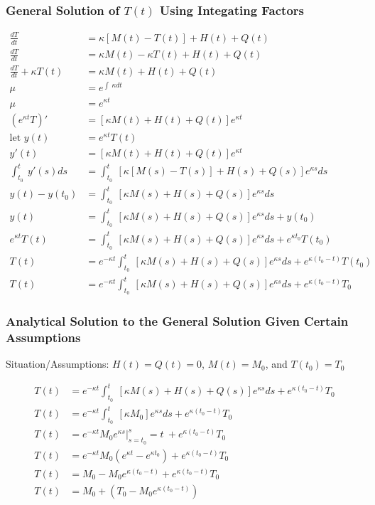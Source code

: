 \documentclass[titlepage]{article}
\begin{document}
\subsubsection{General Solution of $T(t)$ Using Integating Factors}\label{calc:integrating factors}
\begin{align*}
    \frac{dT}{dt} &= \kappa[M(t)-T(t)]+H(t)+Q(t) \\
    \frac{dT}{dt} &= \kappa M(t)- \kappa T(t) +H(t)+Q(t) \\
    \frac{dT}{dt} + \kappa T(t) &= \kappa M(t) +H(t)+Q(t) \\
    \mu &= e^{\int \:\kappa dt} \tag{integrating factor}\\
    \mu &= e^{\kappa t} \\
    (e^{\kappa t} T)' &= [\kappa M(t)+H(t)+Q(t)]e^{\kappa t} \\
    \text{let } y(t) &=e^{\kappa t} T(t) \tag{substitution}\\
    y'(t) &= [\kappa M(t)+H(t)+Q(t)]e^{\kappa t} \\
    \int _{t_0}^t\:y'\left(s\right)ds &= \int _{t_0}^t\:[\kappa[M(s)-T(s)]+H(s)+Q(s)]e^{\kappa s}ds\\
    y(t)-y(t_0) &= \int _{t_0}^t\:[\kappa M(s)+H(s)+Q(s)]e^{\kappa s}ds\\
    y(t) &= \int _{t_0}^t\:[\kappa M(s)+H(s)+Q(s)]e^{\kappa s}ds +y(t_0)\\
    e^{\kappa t} T(t) &= \int _{t_0}^t\:[\kappa M(s)+H(s)+Q(s)]e^{\kappa s}ds +e^{\kappa t_0} T(t_0)\\
    T(t) &= e^{-\kappa t}\int _{t_0}^t\:[\kappa M(s)+H(s)+Q(s)]e^{\kappa s}ds +e^{\kappa (t_0-t)} T(t_0)\\
    T(t) &= e^{-\kappa t}\int _{t_0}^t\:[\kappa M(s)+H(s)+Q(s)]e^{\kappa s}ds +e^{\kappa (t_0-t)} T_0        
\end{align*}

\subsubsection{Analytical Solution to the General Solution Given Certain Assumptions}\label{calc:analytical}
\begin{center}
    Situation/Assumptions: $H(t)=Q(t)=0$, $M(t)=M_0$, and $T(t_0)=T_0$
\end{center}
\begin{align*}
    T(t) &= e^{-\kappa t}\int _{t_0}^t\:[\kappa M(s)+H(s)+Q(s)]e^{\kappa s}ds +e^{\kappa (t_0-t)} T_0 \tag{general solution}\\
    T(t) &= e^{-\kappa t}\int _{t_0}^t\:[\kappa M_0]e^{\kappa s}ds +e^{\kappa (t_0-t)} T_0 \tag{plug in assumptions}\\
    T(t) &= e^{-\kappa t} M_0 e^{\kappa s}|_{s=t_0}^s=t\: +e^{\kappa (t_0-t)} T_0\\
    T(t) &= e^{-\kappa t} M_0 (e^{\kappa t}-e^{\kappa t_0})  +e^{\kappa (t_0-t)} T_0\\
    T(t) &= M_0 - M_0 e^{\kappa (t_0-t)}  +e^{\kappa (t_0-t)} T_0\\
    T(t) &= M_0 + (T_0 - M_0 e^{\kappa (t_0-t)}) 
\end{align*}
\end{document}
